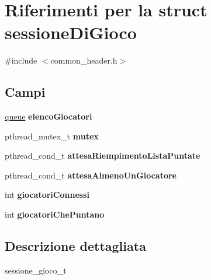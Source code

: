 \hypertarget{structsessioneDiGioco}{
\section{Riferimenti per la struct sessioneDiGioco}
\label{structsessioneDiGioco}
}


{\ttfamily \#include $<$common\_\-header.h$>$}

\subsection*{Campi}
\begin{DoxyCompactItemize}
\item 
\hypertarget{structsessioneDiGioco_a74bc416fee8465dbeb8919b9708f1618}{
\hyperlink{structqueue}{queue} {\bfseries elencoGiocatori}}
\label{structsessioneDiGioco_a74bc416fee8465dbeb8919b9708f1618}

\item 
\hypertarget{structsessioneDiGioco_a74e75157c7bc6988fc32151e9c85f954}{
pthread\_\-mutex\_\-t {\bfseries mutex}}
\label{structsessioneDiGioco_a74e75157c7bc6988fc32151e9c85f954}

\item 
\hypertarget{structsessioneDiGioco_a659e596125d0250d135f3967851efe8e}{
pthread\_\-cond\_\-t {\bfseries attesaRiempimentoListaPuntate}}
\label{structsessioneDiGioco_a659e596125d0250d135f3967851efe8e}

\item 
\hypertarget{structsessioneDiGioco_ae675ab05219ffaba988d15be3e4d9319}{
pthread\_\-cond\_\-t {\bfseries attesaAlmenoUnGiocatore}}
\label{structsessioneDiGioco_ae675ab05219ffaba988d15be3e4d9319}

\item 
\hypertarget{structsessioneDiGioco_a4d2b996fc68699180d23e6e3b7738565}{
int {\bfseries giocatoriConnessi}}
\label{structsessioneDiGioco_a4d2b996fc68699180d23e6e3b7738565}

\item 
\hypertarget{structsessioneDiGioco_a14c97e048c966c43a2586def759ed0fc}{
int {\bfseries giocatoriChePuntano}}
\label{structsessioneDiGioco_a14c97e048c966c43a2586def759ed0fc}

\end{DoxyCompactItemize}


\subsection{Descrizione dettagliata}
sessione\_\-gioco\_\-t

